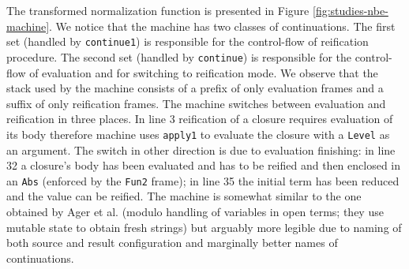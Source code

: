 The transformed normalization function is presented in Figure \ref{fig:studies-nbe-machine}.
We notice that the machine has two classes of continuations.
The first set (handled by \lstinline!continue1!) is responsible for the control-flow of reification procedure.
The second set (handled by \lstinline!continue!) is responsible for the control-flow of evaluation and for switching to reification mode.
We observe that the stack used by the machine consists of a prefix of only evaluation frames and a suffix of only reification frames.
The machine switches between evaluation and reification in three places.
In line 3 reification of a closure requires evaluation of its body therefore machine uses \lstinline!apply1! to evaluate the closure with a \lstinline!Level! as an argument.
The switch in other direction is due to evaluation finishing: in line 32 a closure's body has been evaluated and has to be reified and then enclosed in an \lstinline!Abs! (enforced by the \lstinline!Fun2! frame); in line 35 the initial term has been reduced and the value can be reified.
The machine is somewhat similar to the one obtained by Ager et al. \cite{ager-interpreter-compiler} (modulo handling of variables in open terms; they use mutable state to obtain fresh strings) but arguably more legible due to naming of both source and result configuration and marginally better names of continuations.
